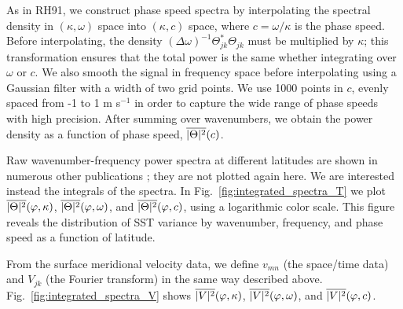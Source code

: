 \documentclass[10pt]{article}
\newcommand{\ol}{\ensuremath{\overline}}
\begin{document}
As in RH91, we construct phase speed spectra by interpolating the spectral density in $(\kappa, \omega)$ space into $(\kappa, c)$ space, where $c = \omega / \kappa$ is the phase speed. Before interpolating, the density $(\Delta \omega)^{-1}\Theta_{jk}^\ast   \Theta_{jk}$ must be multiplied by $\kappa$; this transformation ensures that the total power is the same whether integrating over $\omega$ or $c$. We also smooth the signal in frequency space before interpolating using a Gaussian filter with a width of two grid points. We use 1000 points in $c$, evenly spaced from -1 to 1 m s$^{-1}$ in order to capture the wide range of phase speeds with high precision. After summing over wavenumbers, we obtain the power density as a function of phase speed, $\ol{|\Theta|^2}(c)$.

Raw wavenumber-frequency power spectra at different latitudes are shown in numerous other publications \citep[e.g.][]{KillworthEtAl1997,Wunsch2010,WorthamWunsch2014}; they are not plotted again here. We are interested instead the integrals of the spectra.
In Fig.~\ref{fig:integrated_spectra_T} we plot $\ol{|\Theta|^2}(\varphi, \kappa)$, $\ol{|\Theta|^2}(\varphi, \omega)$, and $\ol{|\Theta|^2}(\varphi, c)$, using a logarithmic color scale. This figure reveals the distribution of SST variance by wavenumber, frequency, and phase speed as a function of latitude.

From the surface meridional velocity data, we define $v_{mn}$ (the space/time data) and $V_{jk}$ (the Fourier transform) in the same way described above. Fig.~\ref{fig:integrated_spectra_V} shows
$\ol{|V|^2}(\varphi, \kappa)$, $\ol{|V|^2}(\varphi, \omega)$, and $\ol{|V|^2}(\varphi, c)$. 
\end{document}

